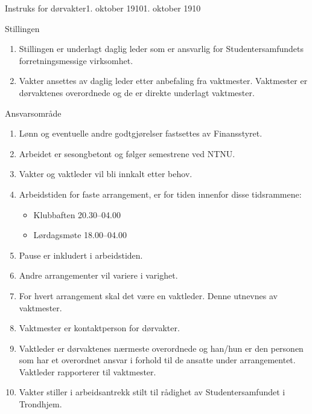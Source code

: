\begin{instruks}{Instruks for dørvakter}{1. oktober 1910}{1. oktober 1910}
    \begin{instruksledd}{Stillingen}
        \begin{enumerate}
            \item Stillingen er underlagt daglig leder som er ansvarlig for Studentersamfundets forretningsmessige virksomhet.
            \item Vakter ansettes av daglig leder etter anbefaling fra vaktmester. Vaktmester er dørvaktenes 
                overordnede og de er direkte underlagt vaktmester.
        \end{enumerate}    
    \end{instruksledd}

    \begin{instruksledd}{Ansvarsområde}
        \begin{enumerate}
            \item Lønn og eventuelle andre godtgjørelser fastsettes av Finansstyret.
            \item Arbeidet er sesongbetont og følger semestrene ved NTNU.
            \item Vakter og vaktleder vil bli innkalt etter behov.
            \item Arbeidstiden for faste arrangement, er for tiden innenfor disse tidsrammene:
                \begin{itemize}
                    \item Klubbaften 20.30--04.00
                    \item Lørdagsmøte 18.00--04.00
                \end{itemize}
            \item Pause er inkludert i arbeidstiden.
            \item Andre arrangementer vil variere i varighet.
            \item For hvert arrangement skal det være en vaktleder. Denne utnevnes av vaktmester.
            \item Vaktmester er kontaktperson for dørvakter.
            \item Vaktleder er dørvaktenes nærmeste overordnede og han/hun er den personen som har et overordnet ansvar i
                forhold til de ansatte under arrangementet. Vaktleder rapporterer til vaktmester.
            \item Vakter stiller i arbeidsantrekk stilt til rådighet av Studentersamfundet i Trondhjem.
        \end{enumerate}    
    \end{instruksledd}


\end{instruks}
